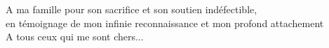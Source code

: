 \thispagestyle{empty}


\begin{center}
  {\it

    A ma famille pour son sacrifice et son soutien indéfectible, \\
    en témoignage de mon infinie reconnaissance et mon profond attachement \\
    \vspace{1cm}
    A tous ceux qui me sont chers...

  }
\end{center}


\cleardoublepage